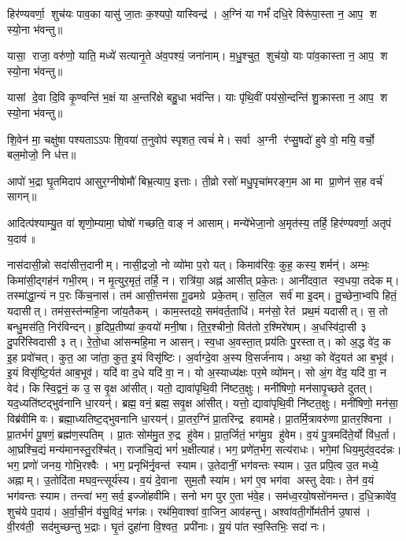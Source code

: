 हिर॑ण्यवर्णा॒ शुच॑यः पाव॒का यासु॑ जा॒तः क॒श्यपो॒ यास्विन्द्र॑।
अ॒ग्निं या गर्भं॑ दधि॒रे विरू॑पा॒स्ता न॒ आप॒ श स्यो॒ना भ॑वन्तु॥

यासा॒ राजा॒ वरु॑णो॒ याति॒ मध्ये॑ सत्यानृ॒ते अ॑व॒पश्यं॒ जना॑नाम्।
म॒धु॒श्चुत॒ शुच॑यो॒ याः पा॑व॒कास्ता न॒ आप॒ श स्यो॒ना भ॑वन्तु॥

यासां दे॒वा दि॒वि कृ॒ण्वन्ति॑ भ॒क्षं या अ॒न्तरि॑क्षे बहु॒धा भव॑न्ति।
याः पृ॑थि॒वीं पय॑सो॒न्दन्ति॑ शु॒क्रास्ता न॒ आप॒ श स्यो॒ना भ॑वन्तु॥

शि॒वेन॑ मा॒ चक्षु॑षा पश्यताऽऽपः शि॒वया॑ त॒नुवोप॑ स्पृशत॒ त्वचं॑ मे।
सर्वा अ॒ग्नी र॑प्सु॒षदो॑ हुवे वो॒ मयि॒ वर्चो॒ बल॒मोजो॒ नि ध॑त्त॥

आपो॑ भ॒द्रा घृ॒तमिदाप॑ आसुर॒ग्नीषोमौ॑ बिभ्र॒त्याप॒ इत्ताः।
ती॒व्रो रसो॑ मधु॒पृचा॑मरङ्ग॒म आ मा प्रा॒णेन॑ स॒ह वर्च॑ सागन्॥

आदित्प॑श्याम्यु॒त वा॑ शृणो॒म्यामा॒ घोषो॑ गच्छति॒ वाङ् न॑ आसाम्।
मन्ये॑भेजा॒नो अ॒मृत॑स्य॒ तर्हि॒ हिर॑ण्यवर्णा॒ अतृपं य॒दाव॑॥

नास॑दासी॒न्नो सदा॑सीत्त॒दानीम्। नासी॒द्रजो॒ नो व्यो॑मा प॒रो यत्।
किमाव॑रिवः॒ कुह॒ कस्य॒ शर्मन्॑। अम्भः॒ किमा॑सी॒द्गह॑नं गभी॒रम्।
न मृ॒त्युर॒मृतं॒ तर्हि॒ न। रात्रि॑या॒ अह्न॑ आसीत् प्रके॒तः।
आनी॑दवा॒त स्व॒धया॒ तदेकम्। तस्मा॑द्धा॒न्यं न प॒रः किंच॒नास॑।
तम॑ आसी॒त्तम॑सा गू॒ढमग्रे प्रके॒तम्। स॒लि॒ल सर्व॑ मा इ॒दम्।
तु॒च्छेना॒भ्वपि हितं॒ यदासीत्। तम॑स॒स्त॑न्महि॒ना जा॑य॒तैकम्।
काम॒स्तदग्रे॒ सम॑वर्त॒ताधि॑। मन॑सो॒ रेत॑ प्रथ॒मं यदासीत्।
स॒ तो बन्धु॒मस॑ति॒ निर॑विन्दन्। हृ॒दिप्र॒तीष्या॑ क॒वयो॑ मनी॒षा।
ति॒र॒श्चीनो॒ वित॑तो र॒श्मिरे॑षाम्। अ॒धस्वि॑दा॒सी ३ दु॒परि॑स्विदासी ३ त्।
रे॒तो॒धा आ॑सन्महि॒मा न आसन्। स्व॒धा अ॒वस्ता॒त् प्रय॑तिः पु॒रस्तात्।
को अ॒द्ध वे॑द॒ क इ॒ह प्रवो॑चत्। कुत॒ आ जा॑ता॒ कुत॒ इ॒यं विसृ॑ष्टिः।
अ॒र्वाग्दे॒वा अ॒स्य वि॒सर्ज॑नाय। अथा॒ को वे॑द॒यत॑ आ ब॒भूव॑।
इ॒यं विसृ॑ष्टि॒र्यत॑ आब॒भूव॑। यदि॑ वा द॒धे यदि॑ वा॒ न।
यो अ॒स्याध्य॑क्षः पर॒मे व्यो॑मन्। सो अं॒ग वे॑द॒ यदि॑ वा॒ न वेद॑।
किस्वि॒द्वनं॒ क उ॒ स वृ॒क्ष आ॑सीत्। यतो॒ द्यावा॑पृथि॒वी नि॑ष्टत॒क्षुः।
मनी॑षिणो॒ मन॑सापृ॒च्छते दुतत्। यद॒ध्यति॑ष्टद्भुव॑नानि धा॒रयन्॑।
ब्रह्म॒ वनं॒ ब्रह्म॒ सवृ॒क्ष आ॑सीत्। यत्तो॒ द्यावा॑पृथि॒वी नि॑ष्टत॒क्षुः।
मनी॑षिणो॒ मन॑सा॒ विब्र॑वीमि वः। ब्रह्मा॒ध्यतिष्ट॒द्भुवनानि धा॒रयन्॑।
प्रा॒तर॒ग्निं प्रा॒तरिन्द्र हवामहे। प्रा॒तर्मि॒त्रावरु॑णा प्रा॒तर॒श्विना।
प्रा॒तर्भगं॑ पू॒षणं॒ ब्रह्म॑ण॒स्पतिम्। प्रा॒तः सोम॑मु॒त रु॒द्र हु॑वेम।
प्रा॒त॒र्जितं॒ भग॑मु॒ग्र हु॑वेम। व॒यं पु॒त्रमदि॑ते॒र्यो वि॑ध॒र्ता।
आ॒घ्रश्चि॒द्यं मन्य॑मानस्तु॒रश्चि॑त्। राजा॑चि॒द्यं भगं॑ भ॒क्षीत्याह॑।
भग॒ प्रणे॑त॒र्भग॒ सत्य॑राधः। भगे॒मां धिय॒मुद॑व॒दद॑न्नः।
भग॒ प्रणो॑ जनय॒ गोभि॒रश्वैः। भग॒ प्रनृभि॑र्नृ॒वन्त॑ स्याम।
उ॒तेदानीं॒ भग॑वन्तः स्याम। उ॒त प्रपि॒त्व उ॒त मध्ये॒ अह्नाम्।
उ॒तोदि॑ता मघव॒न्त्सूर्य॑स्य। व॒यं दे॒वाना सुम॒तौ स्या॑म।
भग॑ ए॒व भग॑वा अस्तु देवाः। तेन॑ व॒यं भग॑वन्तः स्याम।
तन्त्वा॑ भग॒ सर्व॒ इज्जो॑हवीमि। सनो भग पुर ए॒ता भ॑वे॒ह।
सम॑ध्व॒रयो॒षसो॑नमन्त। द॒धि॒क्रावे॑व॒ शुच॑ये प॒दाय॑।
अ॒र्वा॒ची॒नं व॑सु॒विदं॒ भग॑न्नः। रथ॑मि॒वाश्वा॑ वा॒जिन॒ आव॑हन्तु।
अश्वा॑वती॒र्गोम॑तीर्न उ॒षास॑। वी॒रव॑ती॒ सद॑मुच्छन्तु भ॒द्राः।
घृ॒तं दुहा॑ना वि॒श्वत॒ प्रपी॑नाः। यू॒यं पा॑त स्व॒स्तिभिः॒ सदा॑ नः।

